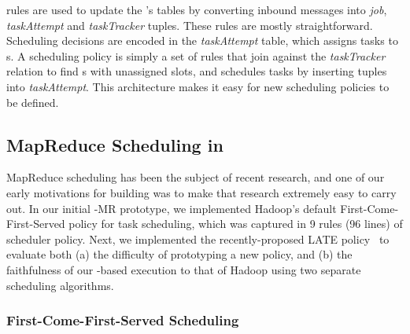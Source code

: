 \OVERLOG rules are used to update the {\JT}'s tables by converting inbound messages
into \emph{job}, \emph{taskAttempt} and \emph{taskTracker} tuples. These rules
are mostly straightforward. Scheduling decisions are encoded in the
\emph{taskAttempt} table, which assigns tasks to {\TT}s. A scheduling policy is
simply a set of rules that join against the \emph{taskTracker} relation to find
\TT{}s with unassigned slots, and schedules tasks by inserting tuples into
\emph{taskAttempt}. This architecture makes it easy for new scheduling policies
to be defined.

\subsection{MapReduce Scheduling in \OVERLOG}

MapReduce scheduling has been the subject of recent research, and one
of our early motivations for building \BOOMA was to make that research
extremely easy to carry out. In our initial \BOOM-MR prototype, we
implemented Hadoop's default First-Come-First-Served policy for task
scheduling, which was captured in 9 rules (96 lines) of scheduler
policy. Next, we implemented the recently-proposed LATE
policy~\cite{zaharia-late} to evaluate both (a) the difficulty of
prototyping a new policy, and (b) the faithfulness of our
\OVERLOG-based execution to that of Hadoop using two separate
scheduling algorithms.

\subsubsection{First-Come-First-Served Scheduling}

